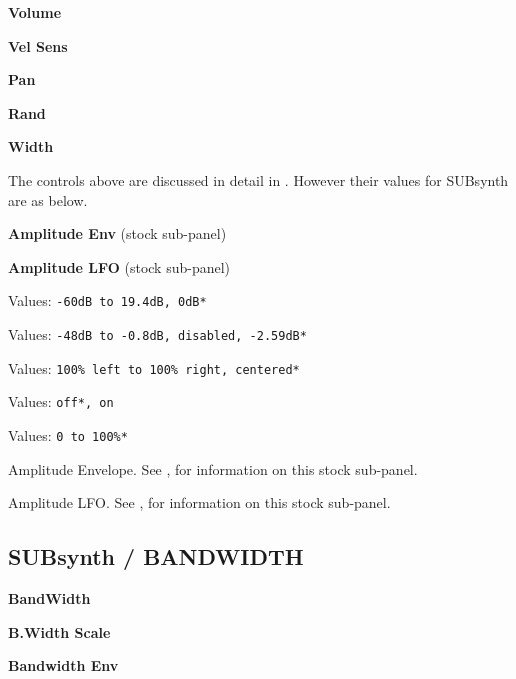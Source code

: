    \begin{enumber}
      \item \textbf{Volume}
      \item \textbf{Vel Sens}
      \item \textbf{Pan}
      \item \textbf{Rand}
      \item \textbf{Width}

       The controls above are discussed in detail in
       . However their values for
       SUBsynth are as below.
      \item \textbf{Amplitude Env} (stock sub-panel)
      \item \textbf{Amplitude LFO} (stock sub-panel)
   \end{enumber}

   \setcounter{ItemCounter}{0}      %


   Values: \texttt{-60dB to 19.4dB, 0dB*}


   Values: \texttt{-48dB to -0.8dB, disabled, -2.59dB*}


   Values: \texttt{100\% left to 100\% right, centered*}


   Values: \texttt{off*, on}


   Values: \texttt{0 to 100\%* }

   Amplitude Envelope.
   See ,
   for information on this stock sub-panel.

   Amplitude LFO.
   See ,
   for information on this stock sub-panel.

\subsection{SUBsynth / BANDWIDTH}
\label{subsec:subsynth_bandwidth}

   \begin{enumber}
      \item \textbf{BandWidth}
      \item \textbf{B.Width Scale}
      \item \textbf{Bandwidth Env}
   \end{enumber}

